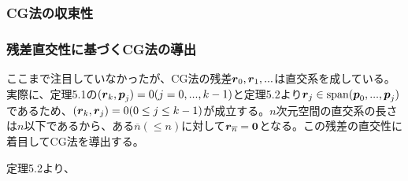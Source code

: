 \documentclass[dvipdfmx, 9pt, a4paper]{jsarticle}
\numberwithin{equation}{subsection}
\newcommand{\bm}[1]{{\mbox{\boldmath $#1$}}}
\begin{document}
\subsubsection{CG法の収束性}



\subsubsection{残差直交性に基づくCG法の導出}
ここまで注目していなかったが、CG法の残差$\bm r_0, \bm r_1, ...$は直交系を成している。実際に、定理5.1の$(\bm r_k, \bm p_j)=0(j=0, ..., k-1)$と定理5.2より$\bm r_j \in {\rm span}(\bm p_0, ..., \bm p_j)$であるため、$(\bm r_k, \bm r_j)=0(0\leq j \leq k-1)$が成立する。$n$次元空間の直交系の長さは$n$以下であるから、ある$\overline{n}(\leq n)$に対して$\bm r_{\overline{n}}=\bm 0$となる。この残差の直交性に着目してCG法を導出する。\par
定理5.2より、
\end{document}
